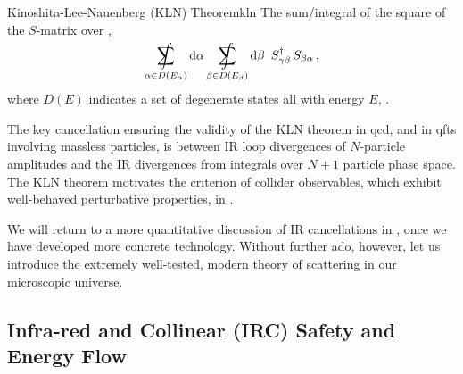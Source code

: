 \begin{theorembox}{Kinoshita-Lee-Nauenberg (KLN) Theorem}{kln}
    The sum/integral of the square of the \(S\)-matrix over ,
    \begin{align}
        \SumInt_{\alpha \in D(E_\alpha)}
        \dd \alpha
        \SumInt_{\beta \in  D(E_\beta)}
        \dd \beta
        \,\,\,
        S^\dagger_{\gamma \beta}
        \,
        S_{\beta \alpha}
        \,,
    \end{align}
    where \(D(E)\) indicates a set of degenerate states all with energy \(E\), .
\end{theorembox}
%
The key cancellation ensuring the validity of the KLN theorem in \gls{qcd}, and in \glspl{qft} involving massless particles, is between IR loop divergences of \(N\)-particle amplitudes and the IR divergences from integrals over \(N+1\) particle phase space.
%
The KLN theorem motivates the criterion of  collider \glspl{observable}, which exhibit well-behaved perturbative properties, in .


We will return to a more quantitative discussion of IR cancellations in , once we have developed more concrete technology.
%
Without further ado, however, let us introduce the extremely well-tested, modern theory of scattering in our microscopic universe.
%


\subsection{Infra-red and Collinear (IRC) Safety and Energy Flow}
\label{sec:irc-safety}

